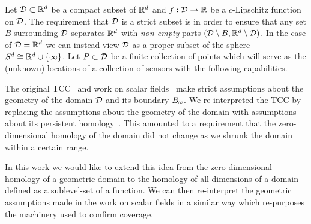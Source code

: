 
Let ${\mathcal{D}}\subset \mathbb{R}^d$ be a compact subset of $\mathbb{R}^d$ and $f:{\mathcal{D}}\to\mathbb{R}$ be a $c$-Lipschitz function on ${\mathcal{D}}$.
The requirement that ${\mathcal{D}}$ is a strict subset is in order to ensure that any set $B$ surrounding ${\mathcal{D}}$ separates $\mathbb{R}^d$ with \emph{non-empty} parts $({\mathcal{D}}\setminus B, \mathbb{R}^d\setminus{\mathcal{D}})$.
In the case of ${\mathcal{D}} = \mathbb{R}^d$ we can instead view ${\mathcal{D}}$ as a proper subset of the sphere $S^d\cong \mathbb{R}^d\cup\{\infty\}$.
Let $P\subset {\mathcal{D}}$ be a finite collection of points which will serve as the (unknown) locations of a collection of sensors with the following capabilities.

\vspace{3ex}
\begin{center}
\setlength{\fboxsep}{2ex}
\end{center}\vspace{3ex}

The original TCC~\cite{desilva07coverage} and work on scalar fields~\cite{chazal09analysis} make strict assumptions about the geometry of the domain ${\mathcal{D}}$ and its boundary $B_{\omega}$.
We re-interpreted the TCC by replacing the assumptions about the geometry of the domain with assumptions about its persistent homology~\cite{cavanna2017when}.
This amounted to a requirement that the zero-dimensional homology of the domain did not change as we shrunk the domain within a certain range.

In this work we would like to extend this idea from the zero-dimensional homology of a geometric domain to the homology of all dimensions of a domain defined as a sublevel-set of a function.
We can then re-interpret the geometric assumptions made in the work on scalar fields in a similar way which re-purposes the machinery used to confirm coverage.

